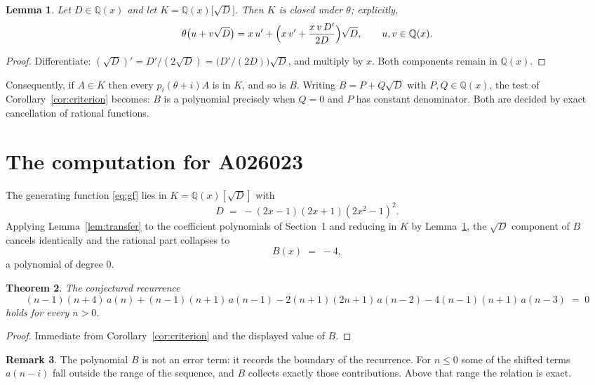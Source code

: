 \documentclass[11pt,a4paper]{article}
\theoremstyle{plain}
\newtheorem{theorem}{Theorem}
\newtheorem{lemma}[theorem]{Lemma}
\theoremstyle{definition}
\newtheorem{remark}[theorem]{Remark}
\begin{document}
\begin{lemma}\label{lem:field}
Let $D\in\mathbb{Q}(x)$ and let $K=\mathbb{Q}(x)\bigl[\sqrt{D}\bigr]$. Then $K$ is closed
under $\theta$; explicitly,
\[
\theta\bigl(u+v\sqrt{D}\bigr)=x\,u'+\Bigl(x\,v'+\frac{x\,v\,D'}{2D}\Bigr)\sqrt{D},
\qquad u,v\in\mathbb{Q}(x).
\]
\end{lemma}

\begin{proof}
Differentiate: $(\sqrt{D})'=D'/(2\sqrt{D})=\bigl(D'/(2D)\bigr)\sqrt{D}$, and multiply by
$x$. Both components remain in $\mathbb{Q}(x)$.
\end{proof}

Consequently, if $A\in K$ then every $p_{i}(\theta+i)A$ is in $K$, and so is $B$. Writing
$B=P+Q\sqrt{D}$ with $P,Q\in\mathbb{Q}(x)$, the test of Corollary~\ref{cor:criterion}
becomes: $B$ is a polynomial precisely when $Q=0$ and $P$ has constant denominator. Both
are decided by exact cancellation of rational functions.

\section{The computation for A026023}

The generating function \eqref{eq:gf} lies in $K=\mathbb{Q}(x)[\sqrt{D}]$ with
\[
D \;=\; - \left(2 x - 1\right) \left(2 x + 1\right) \left(2 x^{2} - 1\right)^{2} .
\]
Applying Lemma~\ref{lem:transfer} to the coefficient polynomials of Section~1 and reducing
in $K$ by Lemma~\ref{lem:field}, the $\sqrt{D}$ component of $B$ cancels identically and
the rational part collapses to
\[
B(x)\;=\;-4 ,
\]
a polynomial of degree $0$.

\begin{theorem}
The conjectured recurrence
\[
\left(n - 1\right) \left(n + 4\right)\,a(n) + \left(n - 1\right) \left(n + 1\right)\,a(n-1) -  2 \left(n + 1\right) \left(2 n + 1\right)\,a(n-2) -  4 \left(n - 1\right) \left(n + 1\right)\,a(n-3) \;=\;0
\]
holds for every $n>0$.
\end{theorem}

\begin{proof}
Immediate from Corollary~\ref{cor:criterion} and the displayed value of $B$.
\end{proof}

\begin{remark}
The polynomial $B$ is not an error term: it records the boundary of the recurrence. For
$n\le0$ some of the shifted terms $a(n-i)$ fall outside the range of the sequence,
and $B$ collects exactly those contributions. Above that range the relation is exact.
\end{remark}
\end{document}
